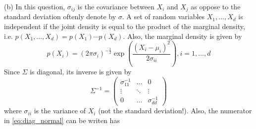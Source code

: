 \documentclass[12pt]{article}
\begin{document}
(b) In this question, $\sigma_{ij}$ is the covariance between $X_i$ and $X_j$ as oppose to the standard deviation oftenly denote by $\sigma$. A set of random variables $X_1,...,X_d$ is independent if the joint density is equal to the product of the marginal density, i.e. $p(X_1,...,X_d)=p(X_1)\cdots p(X_d)$. Also, the marginal density is given by
$$
    p(X_i) = (2\pi\sigma_i)^{-\frac{1}{2}} 
    \exp
    \left(
        \frac{(X_i-\mu_i)^2}{2\sigma_{ii}}
    \right),
    i=1,...,d
$$
Since $\Sigma$ is diagonal, its inverse is given by 
$$
    \Sigma^{-1} = 
    \begin{pmatrix}
        \sigma_{11}^{-1} & \hdots & 0 \\
        \vdots & \ddots & \vdots \\
        0 & \hdots & \sigma_{dd}^{-1}
    \end{pmatrix}
$$
where $\sigma_{ii}$ is the variance of $X_i$ (not the standard deviation!).
Also, the numerator in \ref{eq:diag_normal} can be writen has
\end{document}

